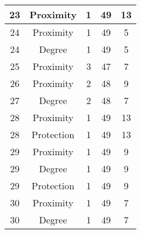 \documentclass[results.tex]{subfiles}
\begin{document}
\begin{center}
\begin{tabular}{| c || c | c | c | c |}
            \hline
            23                      & Proximity                    & 1                      & 49                      & 13                   \\
            \hline
            24                      & Proximity                    & 1                      & 49                      & 5                    \\
            \hline
            24                      & Degree                       & 1                      & 49                      & 5                    \\
            \hline
            25                      & Proximity                    & 3                      & 47                      & 7                    \\
            \hline
            26                      & Proximity                    & 2                      & 48                      & 9                    \\
            \hline
            27                      & Degree                       & 2                      & 48                      & 7                    \\
            \hline
            28                      & Proximity                    & 1                      & 49                      & 13                   \\
            \hline
            28                      & Protection                   & 1                      & 49                      & 13                   \\
            \hline
            29                      & Proximity                    & 1                      & 49                      & 9                    \\
            \hline
            29                      & Degree                       & 1                      & 49                      & 9                    \\
            \hline
            29                      & Protection                   & 1                      & 49                      & 9                    \\
            \hline
            30                      & Proximity                    & 1                      & 49                      & 7                    \\
            \hline
            30                      & Degree                       & 1                      & 49                      & 7                    \\

\end{tabular}
\end{center}
\end{document}
